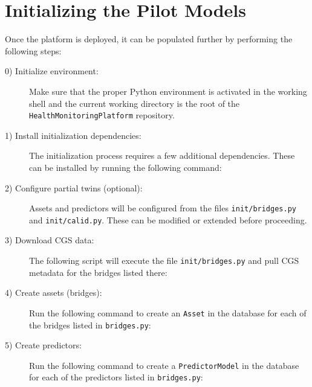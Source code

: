 \section{Initializing the Pilot Models}

Once the platform is deployed, it can be populated further by performing the following steps:
\begin{description}
\item[0) Initialize environment:] Make sure that the proper Python environment
is activated in the working shell and the current working directory
is the root of the \texttt{HealthMonitoringPlatform} repository.

\item[1) Install initialization dependencies:]
The initialization process requires a few additional dependencies. These
can be installed by running the following command:
%
\begin{Shaded}
\begin{Highlighting}[]
 
\end{Highlighting}
\end{Shaded}

\item[{2) Configure partial twins} (optional):]
Assets and predictors will be configured from the files \texttt{init/bridges.py} and \texttt{init/calid.py}. These can be modified or extended before proceeding.

\item[3) Download CGS data:]
The following script will execute the file \texttt{init/bridges.py} and
pull CGS metadata for the bridges listed there:
%
\begin{Shaded}
\begin{Highlighting}[]
\OperatorTok{\textgreater{}}
\end{Highlighting}
\end{Shaded}

\item[4) Create assets (bridges):]
Run the following command to create an \texttt{Asset} in the database for
each of the bridges listed in \texttt{bridges.py}:
%
\begin{Shaded}
\begin{Highlighting}[]
\OperatorTok{\textless{}}
\end{Highlighting}
\end{Shaded}

\item[5) Create predictors:]
Run the following command to create a \texttt{PredictorModel} in the
database for each of the predictors listed in \texttt{bridges.py}:
\begin{Shaded}
\begin{Highlighting}[]
\OperatorTok{\textless{}}
\end{Highlighting}
\end{Shaded}
\end{description}

